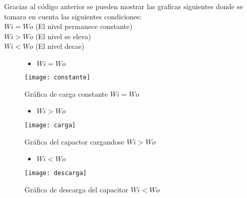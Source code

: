 \documentclass[letterpaper,10pt]{article}
\begin{document}
\vspace*{0.3in}
\textbf{}
Gracias al código anterior se pueden mostrar las graficas siguientes donde se tomara en cuenta las siguientes condiciones:\\ $ Wi = Wo $ (El nivel permanece constante)\\$ Wi > Wo $ (El nivel se eleva)\\$ Wi < Wo $ (El nivel decae)\\


\vspace*{0.3in}
\begin{figure}[h!]
	\begin{itemize}
		\item $ Wi = Wo $
	\end{itemize}
	\centering
	\texttt{[image: constante]}
	\caption{Gráfica de carga constante $ Wi = Wo $}
\end{figure}


\vspace*{0.3in}
\begin{figure}[h!]
	\begin{itemize}
		\item $ Wi > Wo $
	\end{itemize}
	\centering
	\texttt{[image: carga]}
	\caption{Gráfica del capactor cargandose $ Wi > Wo $}
\end{figure}

\vspace*{0.3in}
\begin{figure}[h!]
	\begin{itemize}
		\item $ Wi < Wo $
	\end{itemize}
	\centering
	\texttt{[image: descarga]}
	\caption{Gráfica de descarga del capacitor $ Wi < Wo $}
\end{figure}

\newpage
\vspace*{1.5in}
\end{document}
